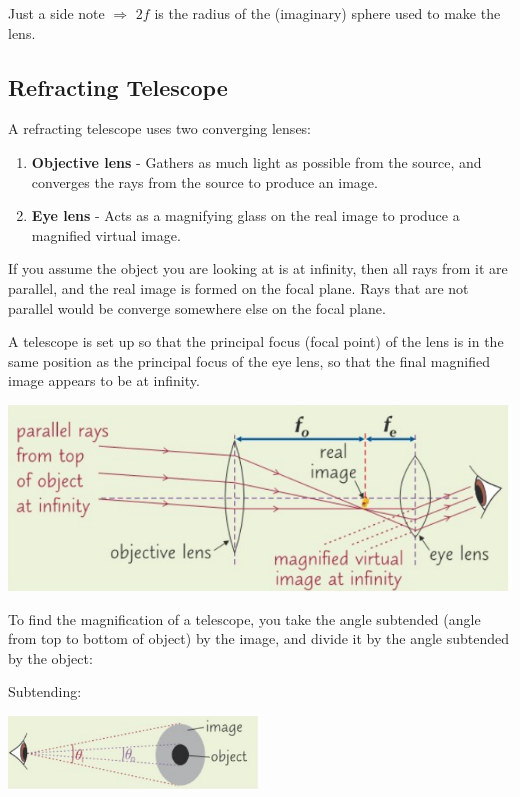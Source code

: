 \documentclass[a4paper, 12pt]{article}
\begin{document}
Just a side note $\Rightarrow$ $2f$ is the radius of the (imaginary) sphere used to make the lens.

\subsection{Refracting Telescope}

A refracting telescope uses two converging lenses:

\begin{enumerate}
	\item{
		\textbf{Objective lens} - Gathers as much light as possible from the source, and converges the rays from the source to produce an image.
	}
	\item{
		\textbf{Eye lens} - Acts as a magnifying glass on the real image to produce a magnified virtual image.
	}
\end{enumerate}

If you assume the object you are looking at is at infinity, then all rays from it are parallel, and the real image is formed on the focal plane. Rays that are not parallel would be converge somewhere else on the focal plane.

A telescope is set up so that the principal focus (focal point) of the lens is in the same position as the principal focus of the eye lens, so that the final magnified image appears to be at infinity.

\includegraphics[width=\textwidth]{images/refactingTeleLayout.png}

To find the magnification of a telescope, you take the angle subtended (angle from top to bottom of object) by the image, and divide it by the angle subtended by the object:

Subtending:

\begin{center}
\includegraphics[width=0.5\textwidth]{images/subtend.png}
\end{center}
\end{document}
